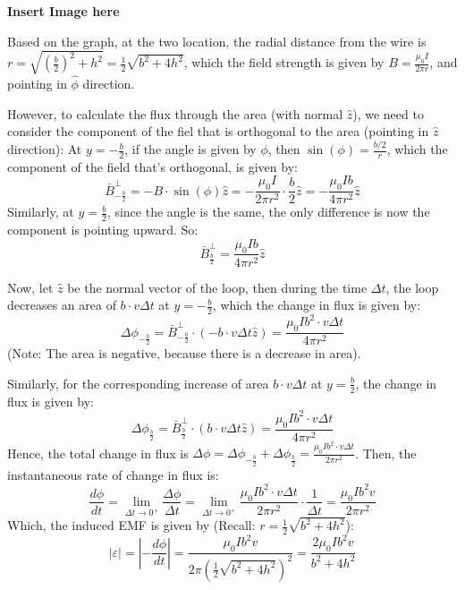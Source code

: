 \documentclass{article}
\begin{document}
\hfill

\textbf{Insert Image here}

Based on the graph, at the two location, the radial distance from the wire is $r=\sqrt{(\frac{b}{2})^2+h^2} = \frac{1}{2}\sqrt{b^2+4h^2}$,
which the field strength is given by $B=\frac{\mu_0I}{2\pi r}$, and pointing in $\hat{\phi}$ direction.

However, to calculate the flux through the area (with normal $\hat{z}$), we need to consider the component of the fiel that is orthogonal to the area (pointing in $\hat{z}$ direction):
At $y=-\frac{b}{2}$, if the angle is given by $\phi$, then $\sin(\phi)=\frac{b/2}{r}$, which the component of the field that's orthogonal, is given by:
$$\bar{B}^\perp_{-\frac{b}{2}}=-B\cdot \sin(\phi)\hat{z} = -\frac{\mu_0I}{2\pi r^2}\cdot \frac{b}{2}\hat{z} = -\frac{\mu_0Ib}{4\pi r^2}\hat{z}$$
Similarly, at $y=\frac{b}{2}$, since the angle is the same, the only difference is now the component is pointing upward. So:
$$\bar{B}^\perp_{\frac{b}{2}}=\frac{\mu_0Ib}{4\pi r^2}\hat{z}$$

\hfill

Now, let $\hat{z}$ be the normal vector of the loop, then during the time $\Delta t$, the loop decreases an area of $b\cdot v\Delta t$ at $y=-\frac{b}{2}$,
which the change in flux is given by:
$$\Delta\phi_{-\frac{b}{2}}=\bar{B}^\perp_{-\frac{b}{2}}\cdot\left(-b\cdot v\Delta t\hat{z}\right) = \frac{\mu_0Ib^2\cdot v\Delta t}{4\pi r^2}$$
(Note: The area is negative, because there is a decrease in area).

Similarly, for the corresponding increase of area $b\cdot v\Delta t$ at $y=\frac{b}{2}$, the change in flux is given by:
$$\Delta\phi_{\frac{b}{2}}=\bar{B}^\perp_{\frac{b}{2}}\cdot\left(b\cdot v\Delta t\hat{z}\right)=\frac{\mu_0Ib^2\cdot v\Delta t}{4\pi r^2}$$
Hence, the total change in flux is $\Delta \phi = \Delta\phi_{-\frac{b}{2}}+\Delta\phi_{\frac{b}{2}}=\frac{\mu_0Ib^2\cdot v\Delta t}{2\pi r^2}$. Then, the instantaneous rate of change in flux is:
$$\frac{d\phi}{dt} = \lim_{\Delta t\rightarrow 0^+}\frac{\Delta \phi}{\Delta t}=\lim_{\Delta t\rightarrow 0^+}\frac{\mu_0Ib^2\cdot v\Delta t}{2\pi r^2}\cdot \frac{1}{\Delta t}=\frac{\mu_0Ib^2v}{2\pi r^2}$$
Which, the induced EMF is given by (Recall: $r=\frac{1}{2}\sqrt{b^2+4h^2}$):
$$|\varepsilon|=\left|-\frac{d\phi}{dt}\right|=\frac{\mu_0Ib^2v}{2\pi (\frac{1}{2}\sqrt{b^2+4h^2})^2} = \frac{2\mu_0Ib^2v}{b^2+4h^2}$$


\break
\end{document}
